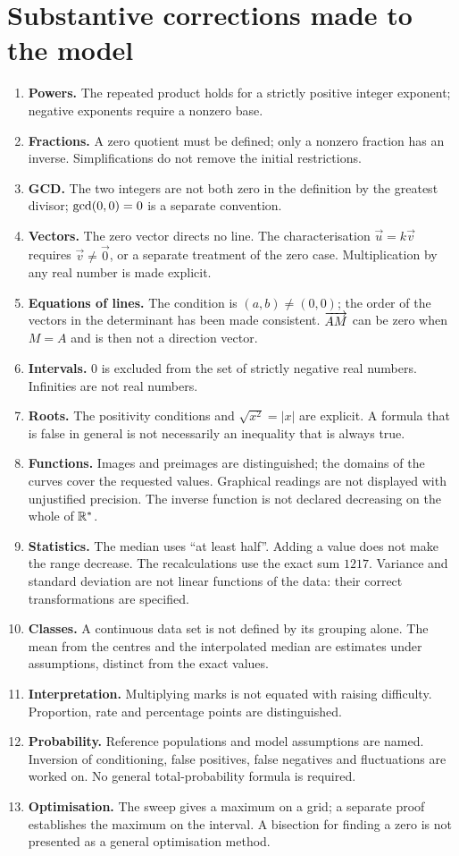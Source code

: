 \clearpage\section*{Substantive corrections made to the model}
\begin{enumerate}
\item \textbf{Powers.} The repeated product holds for a strictly positive integer exponent; negative exponents require a nonzero base.
\item \textbf{Fractions.} A zero quotient must be defined; only a nonzero fraction has an inverse. Simplifications do not remove the initial restrictions.
\item \textbf{GCD.} The two integers are not both zero in the definition by the greatest divisor; $\operatorname{gcd}(0,0)=0$ is a separate convention.
\item \textbf{Vectors.} The zero vector directs no line. The characterisation $\vec u=k\vec v$ requires $\vec v\ne\vec0$, or a separate treatment of the zero case. Multiplication by any real number is made explicit.
\item \textbf{Equations of lines.} The condition is $(a,b)\ne(0,0)$; the order of the vectors in the determinant has been made consistent. $\overrightarrow{AM}$ can be zero when $M=A$ and is then not a direction vector.
\item \textbf{Intervals.} $0$ is excluded from the set of strictly negative real numbers. Infinities are not real numbers.
\item \textbf{Roots.} The positivity conditions and $\sqrt{x^2}=|x|$ are explicit. A formula that is false in general is not necessarily an inequality that is always true.
\item \textbf{Functions.} Images and preimages are distinguished; the domains of the curves cover the requested values. Graphical readings are not displayed with unjustified precision. The inverse function is not declared decreasing on the whole of $\mathbb{R}^*$.
\item \textbf{Statistics.} The median uses ``at least half''. Adding a value does not make the range decrease. The recalculations use the exact sum $1217$. Variance and standard deviation are not linear functions of the data: their correct transformations are specified.
\item \textbf{Classes.} A continuous data set is not defined by its grouping alone. The mean from the centres and the interpolated median are estimates under assumptions, distinct from the exact values.
\item \textbf{Interpretation.} Multiplying marks is not equated with raising difficulty. Proportion, rate and percentage points are distinguished.
\item \textbf{Probability.} Reference populations and model assumptions are named. Inversion of conditioning, false positives, false negatives and fluctuations are worked on. No general total-probability formula is required.
\item \textbf{Optimisation.} The sweep gives a maximum on a grid; a separate proof establishes the maximum on the interval. A bisection for finding a zero is not presented as a general optimisation method.
\end{enumerate}

